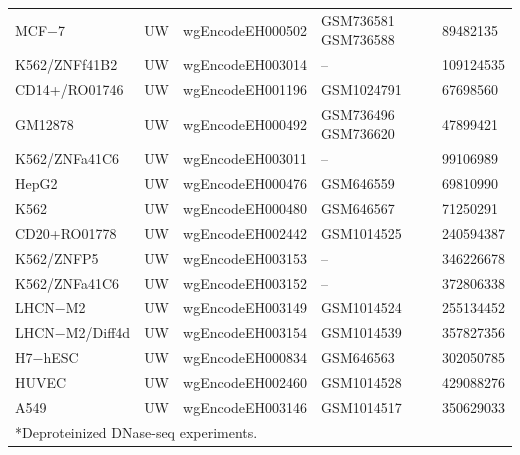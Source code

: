 \documentclass[11pt]{article}
\begin{document}
\begin{longtable}{p{3.5cm}p{1cm}p{4cm}p{2.8cm}p{3cm}}
MCF−7 & UW & wgEncodeEH000502 & GSM736581 \newline GSM736588 & 89482135 \\
K562/ZNFf41B2 & UW & wgEncodeEH003014 & -- & 109124535 \\
CD14+/RO01746 & UW & wgEncodeEH001196 & GSM1024791 & 67698560 \\
GM12878 & UW & wgEncodeEH000492 & GSM736496 \newline GSM736620 & 47899421 \\
K562/ZNFa41C6 & UW & wgEncodeEH003011 & -- & 99106989 \\
HepG2 & UW & wgEncodeEH000476 & GSM646559 & 69810990 \\
K562 & UW & wgEncodeEH000480 & GSM646567 & 71250291 \\
CD20+RO01778 & UW & wgEncodeEH002442 & GSM1014525 & 240594387 \\
K562/ZNFP5 & UW & wgEncodeEH003153 & -- & 346226678 \\
K562/ZNFa41C6 & UW & wgEncodeEH003152 & -- & 372806338 \\
LHCN−M2 & UW & wgEncodeEH003149 & GSM1014524 & 255134452 \\
LHCN−M2/Diff4d & UW & wgEncodeEH003154 & GSM1014539 & 357827356 \\
H7−hESC & UW & wgEncodeEH000834 & GSM646563 & 302050785 \\
HUVEC & UW & wgEncodeEH002460 & GSM1014528 & 429088276 \\
A549 & UW & wgEncodeEH003146 & GSM1014517 & 350629033 \\
\hline
\multicolumn{5}{l}{*Deproteinized DNase-seq experiments.} \\
\end{longtable}

\clearpage
\end{document}
